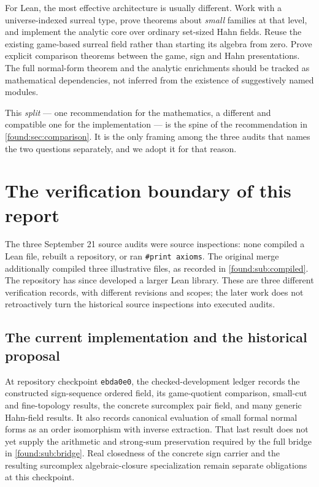 \documentclass[11pt,letterpaper]{article}
\numberwithin{equation}{section}
\theoremstyle{definition}
\theoremstyle{remark}
\begin{document}
For Lean, the most effective architecture is usually different. Work with a
universe-indexed surreal type, prove theorems about \emph{small} families at
that level, and implement the analytic core over ordinary set-sized Hahn
fields. Reuse the existing game-based surreal field rather than starting its
algebra from zero. Prove explicit comparison theorems between the game, sign
and Hahn presentations. The full normal-form theorem and the analytic
enrichments should be tracked as mathematical dependencies, not inferred from
the existence of suggestively named modules.

This \emph{split} --- one recommendation for the mathematics, a different and
compatible one for the implementation --- is the spine of the recommendation in
\cref{found:sec:comparison}. It is the only framing among the three audits that
names the two questions separately, and we adopt it for that reason.

\section{The verification boundary of this report}
\label{found:sec:boundary}

The three September 21 source audits were source inspections: none compiled
a Lean file, rebuilt a repository, or ran \texttt{\#print axioms}. The original
merge additionally compiled three illustrative files, as recorded in
\cref{found:sub:compiled}. The repository has since developed a larger Lean
library. These are three different verification records, with different
revisions and scopes; the later work does not retroactively turn the historical
source inspections into executed audits.

\subsection{The current implementation and the historical proposal}
\label{found:sub:currentimplementation}
At repository checkpoint \texttt{ebda0e0}, the checked-development ledger
 records the constructed sign-sequence ordered
field, its game-quotient comparison, small-cut and fine-topology results, the
concrete surcomplex pair field, and many generic Hahn-field results. It also
records canonical evaluation of small formal normal forms as an order
isomorphism with inverse extraction. That last result does not yet supply the
arithmetic and strong-sum preservation required by the full bridge in
\cref{found:sub:bridge}. Real closedness of the concrete sign carrier and the
resulting surcomplex algebraic-closure specialization remain separate
obligations at this checkpoint.
\end{document}
